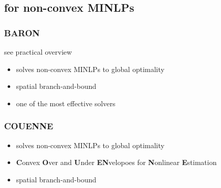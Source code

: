 \documentclass{article}
\begin{document}
\subsection{for non-convex MINLPs}
\subsubsection{BARON}
see practical overview \cite{d2013mixed}
\begin{itemize}
\item solves non-convex MINLPs to global optimality
\item spatial branch-and-bound
\item one of the most effective solvers
\end{itemize}

\subsubsection{COUENNE}
\begin{itemize}
\item solves non-convex MINLPs to global optimality
\item \textbf{C}onvex \textbf{O}ver and \textbf{U}nder \textbf{EN}velopoes for \textbf{N}onlinear \textbf{E}stimation
\item spatial branch-and-bound
\end{itemize}

{}

\end{document}
